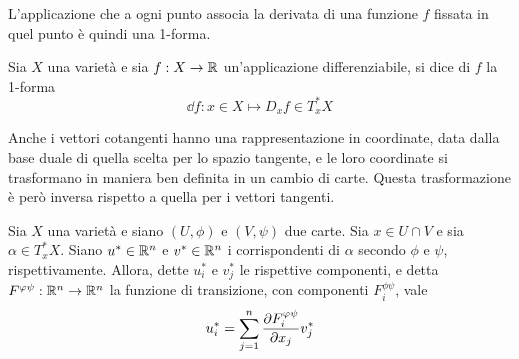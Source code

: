 L'applicazione che a ogni punto associa la derivata di una funzione $f$ fissata in quel punto è quindi una 1-forma.
\begin{definition} \label{def:differential}
  Sia $X$ una varietà e sia $f:X\to \mathbb{R}$ un'applicazione differenziabile, si dice  di $f$ la 1-forma \begin{equation}
  \dd f: x \in X \mapsto D_x f \in T_x^* X
  \end{equation} 
\end{definition}

Anche i vettori cotangenti hanno una rappresentazione in coordinate, data dalla base duale di quella scelta per lo spazio tangente, e le loro coordinate si trasformano in maniera ben definita in un cambio di carte. Questa trasformazione è però inversa rispetto a quella per i vettori tangenti.
\begin{theorem} 
  Sia $X$ una varietà e siano $(U,\phi)$ e $(V,\psi)$ due carte. Sia $x \in  U \cap V$ e sia $\alpha \in  T_x^* X$. Siano $u^* \in \mathbb{R}^{n}$ e $v^* \in  \mathbb{R}^{n}$ i corrispondenti di $\alpha$ secondo $\phi$ e $\psi$, rispettivamente. Allora, dette $u^*_i$ e $v^*_j$ le rispettive componenti, e detta $F^{\varphi\psi}:\mathbb{R}^{n} \to \mathbb{R}^{n}$ la funzione di transizione, con componenti $F^{\phi \psi}_i$, vale \begin{equation} \label{eq:cvcTrans}
  u^*_i = \sum_{j=1}^n \pdv{F^{\varphi\psi}_i}{x_j} v^*_j
  \end{equation} 
\end{theorem}

